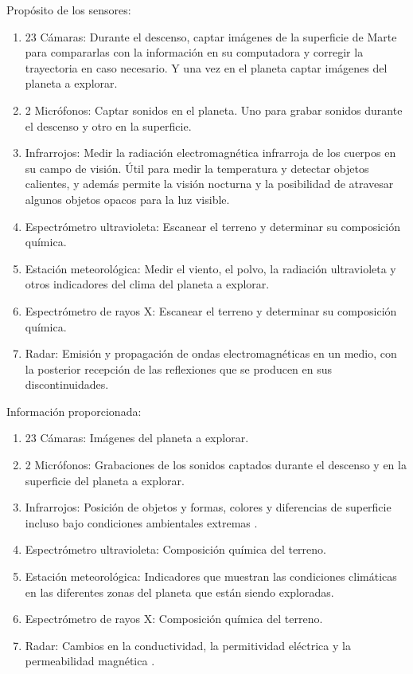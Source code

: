 \documentclass{article}
\begin{document}
        Propósito de los sensores:
        \begin{enumerate}
            \item 23 Cámaras: Durante el descenso, captar imágenes de la superficie de Marte para compararlas con la información en su computadora y corregir la trayectoria en caso necesario. Y una vez en el planeta captar imágenes del planeta a explorar.
            \item 2 Micrófonos: Captar sonidos en el planeta. Uno para grabar sonidos durante el descenso y otro en la superficie.
            \item Infrarrojos: Medir la radiación electromagnética infrarroja de los cuerpos en su campo de visión. Útil para medir la temperatura y detectar objetos calientes, y además permite la visión nocturna y la posibilidad de atravesar algunos objetos opacos para la luz visible.
            \item Espectrómetro ultravioleta: Escanear el terreno y determinar su composición química.
            \item Estación meteorológica: Medir el viento, el polvo, la radiación ultravioleta y otros indicadores del clima del planeta a explorar.
            \item Espectrómetro de rayos X: Escanear el terreno y determinar su composición química.
            \item Radar: Emisión y propagación de ondas electromagnéticas en un medio, con la posterior recepción de las reflexiones que se producen en sus discontinuidades.
        \end{enumerate}

        Información proporcionada:
        \begin{enumerate}
            \item 23 Cámaras: Imágenes del planeta a explorar.
            \item 2 Micrófonos: Grabaciones de los sonidos captados durante el descenso y en la superficie del planeta a explorar.
            \item Infrarrojos: Posición de objetos y formas, colores y diferencias de superficie incluso bajo condiciones ambientales extremas \parencite{direct-2021}.
            \item Espectrómetro ultravioleta: Composición química del terreno.
            \item Estación meteorológica: Indicadores que muestran las condiciones climáticas en las diferentes zonas del planeta que están siendo exploradas.
            \item Espectrómetro de rayos X: Composición química del terreno.
            \item Radar: Cambios en la conductividad, la permitividad eléctrica y la permeabilidad magnética \parencite{geo-radar-mars}. 
        \end{enumerate}
\end{document}
